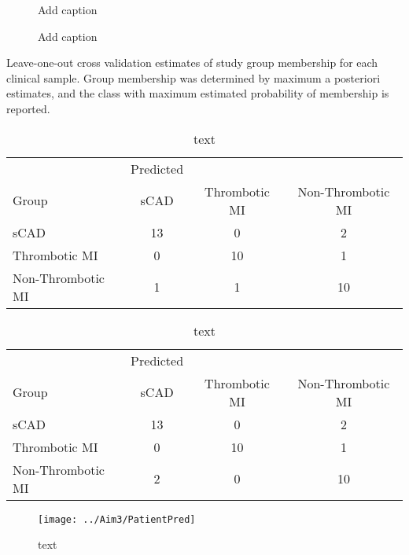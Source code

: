 \begin{figure}[H]
	\caption[Add caption]{Add caption \label{fig:ptid2010MCMC} }
\end{figure}

\begin{figure}[H]
	\caption[Add caption]{Add caption \label{fig:ptid2010Hist} }
\end{figure}
 
Leave-one-out cross validation estimates of study group membership for each clinical sample. Group membership was determined by maximum a posteriori estimates, and the class with maximum estimated probability of membership is reported.
 
 \begin{table}[H]
	\centering
 	\caption{text}
 	\label{tab:modelRes}
 	\begin{tabular}{l|ccc}
 		& Predicted & & \\
 		Group  &     sCAD & Thrombotic MI & Non-Thrombotic MI \\
 		\hline
 		sCAD   &     13    &     0    &     2\\
 		Thrombotic MI  &  0    &    10    &     1\\
 		Non-Thrombotic MI &   1    &     1   &     10
 	\end{tabular}
 \end{table}
 
  \begin{table}[H]
  	\centering
  	\caption{text}
  	\label{tab:modelRes2}
  	\begin{tabular}{l|ccc}
  		& Predicted & & \\
  		Group  &     sCAD & Thrombotic MI & Non-Thrombotic MI \\
  		\hline
  		sCAD   &     13    &     0    &     2\\
  		Thrombotic MI  &  0    &    10    &     1\\
  		Non-Thrombotic MI &   2  &   0 &    10
  	\end{tabular}
  \end{table}
  
  \begin{figure}[H]
	  	\centering
  	  	\caption{text}
 	  	\label{tab:modelRes3}
  	\texttt{[image: ../Aim3/PatientPred]}
  \end{figure}